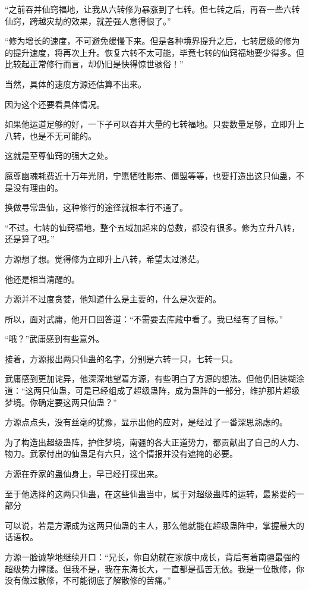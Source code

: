 \begin{this_body}
“之前吞并仙窍福地，让我从六转修为暴涨到了七转。但七转之后，再吞一些六转仙窍，跨越灾劫的效果，就差强人意得很了。”

“修为增长的速度，不可避免缓慢下来。但是各种境界提升之后，七转层级的修为的提升速度，将再次上升。恢复六转不太可能，毕竟七转的仙窍福地要少得多。但比较起正常修行而言，却仍旧是快得惊世骇俗！”

当然，具体的速度方源还估算不出来。

因为这个还要看具体情况。

如果他运道足够的好，一下子可以吞并大量的七转福地。只要数量足够，立即升上八转，也是不无可能的。

这就是至尊仙窍的强大之处。

魔尊幽魂耗费近十万年光阴，宁愿牺牲影宗、僵盟等等，也要打造出这只仙蛊，不是没有理由的。

换做寻常蛊仙，这种修行的途径就根本行不通了。

“不过。七转的仙窍福地，整个五域加起来的总数，都没有很多。修为立升八转，还是算了吧。”

方源想了想。觉得修为立即升上八转，希望太过渺茫。

他还是相当清醒的。

方源并不过度贪婪，他知道什么是主要的，什么是次要的。

所以，面对武庸，他开口回答道：“不需要去库藏中看了。我已经有了目标。”

“哦？”武庸感到有些意外。

接着，方源报出两只仙蛊的名字，分别是六转一只，七转一只。

武庸感到更加诧异，他深深地望着方源，有些明白了方源的想法。但他仍旧装糊涂道：“这两只仙蛊，可是已经组成了超级蛊阵，成为蛊阵的一部分，维护那片超级梦境。你确定要这两只仙蛊？”

方源点点头，没有丝毫的犹豫，显示出他的应对，是经过了一番深思熟虑的。

为了构造出超级蛊阵，护住梦境，南疆的各大正道势力，都贡献出了自己的人力、物力。武家付出的仙蛊足有六只，这个情报并没有遮掩的必要。

方源在乔家的蛊仙身上，早已经打探出来。

至于他选择的这两只仙蛊，在这些仙蛊当中，属于对超级蛊阵的运转，最紧要的一部分

可以说，若是方源成为这两只仙蛊的主人，那么他就能在超级蛊阵中，掌握最大的话语权。

方源一脸诚挚地继续开口：“兄长，你自幼就在家族中成长，背后有着南疆最强的超级势力撑腰。但我不是，我在东海长大，一直都是孤苦无依。我是一位散修，你没有做过散修，不可能彻底了解散修的苦痛。”


\end{this_body}
